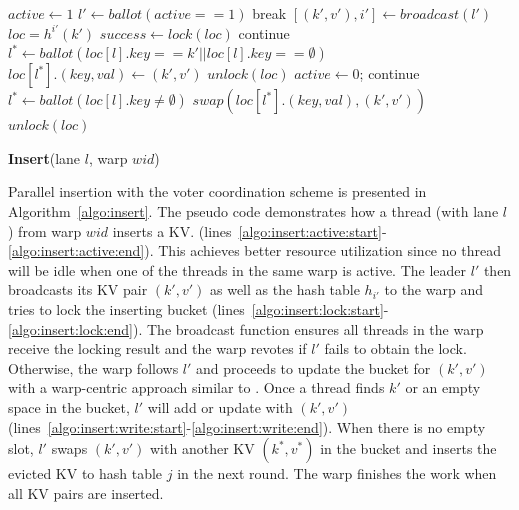\begin{algorithm}[t]
	\begin{algorithmic}[1]
		\State $active \gets 1$	\label{algo:insert:active:start}
		\State $l' \gets ballot(active == 1)$ \label{algo:insert:vote:start}
		\State break \label{algo:insert:active:end}
		\EndIf
		\State $[(k',v'),i'] \gets broadcast(l')$ \label{algo:insert:lock:start}
		\State $loc = h^{i'}(k')$
		\State $success \gets lock(loc)$ \label{algo:insert:lock:end}
		\EndIf
		\State continue					\label{algo:insert:vote:end}
		\EndIf
		\State $l^* \gets ballot(loc[l].key == k' || loc[l].key ==\emptyset)$ \label{algo:insert:write:start}
		\State $loc[l^*].(key,val) \gets (k',v')$
		\State $unlock(loc)$
		\State $active \gets 0$;
		\State continue			\label{algo:insert:write:end}
		\EndIf
		\State $l^* \gets ballot(loc[l].key \neq \emptyset)$
		\State $swap(loc[l^*].(key,val),(k',v'))$
		\State $unlock(loc)$ \label{algo:insert:loop:end}
		\EndIf
		\EndWhile
	\end{algorithmic}
	\caption{\textbf{Insert}(lane $l$, warp $wid$)}\label{algo:insert}
\end{algorithm}

Parallel insertion with the voter coordination scheme is presented in Algorithm~\ref{algo:insert}.
The pseudo code demonstrates how a thread (with lane $l$) from warp $wid$ inserts a KV. 
 (lines~\ref{algo:insert:active:start}-\ref{algo:insert:active:end}).  
This achieves better resource utilization since no thread will be idle when one of the threads in the same warp is active.  
The leader $l'$ then broadcasts its KV pair $(k',v')$ as well as the hash table $h_{i'}$ to the warp and tries to lock the inserting bucket (lines~\ref{algo:insert:lock:start}-\ref{algo:insert:lock:end}). 
The broadcast function ensures all threads in the warp receive the locking result and the warp revotes if $l'$ fails to obtain the lock.
Otherwise, the warp follows $l'$ and proceeds to update the bucket for $(k',v')$ with a warp-centric approach similar to .
Once a thread finds $k'$ or an empty space in the bucket, $l'$ will add or update with $(k',v')$ (lines~\ref{algo:insert:write:start}-\ref{algo:insert:write:end}).
When there is no empty slot, $l'$ swaps $(k',v')$ with another KV $(k^*,v^*)$ in the bucket and inserts the evicted KV to hash table $j$ in the next round. 
The warp finishes the work when all KV pairs are inserted.

